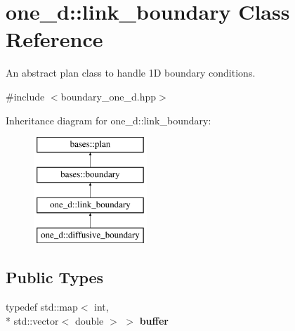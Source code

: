 \hypertarget{classone__d_1_1link__boundary}{\section{one\-\_\-d\-:\-:link\-\_\-boundary Class Reference}
\label{classone__d_1_1link__boundary}
}


An abstract plan class to handle 1\-D boundary conditions.  




{\ttfamily \#include $<$boundary\-\_\-one\-\_\-d.\-hpp$>$}

Inheritance diagram for one\-\_\-d\-:\-:link\-\_\-boundary\-:\begin{figure}[H]
\begin{center}
\leavevmode
\includegraphics[height=4.000000cm]{classone__d_1_1link__boundary}
\end{center}
\end{figure}
\subsection*{Public Types}
\begin{DoxyCompactItemize}
\item 
\hypertarget{classone__d_1_1link__boundary_aac2a6d1e68fc6b0bf95a5e1055db1f8c}{typedef std\-::map$<$ int, \\*
std\-::vector$<$ double $>$ $>$ {\bfseries buffer}}\label{classone__d_1_1link__boundary_aac2a6d1e68fc6b0bf95a5e1055db1f8c}

\end{DoxyCompactItemize}
